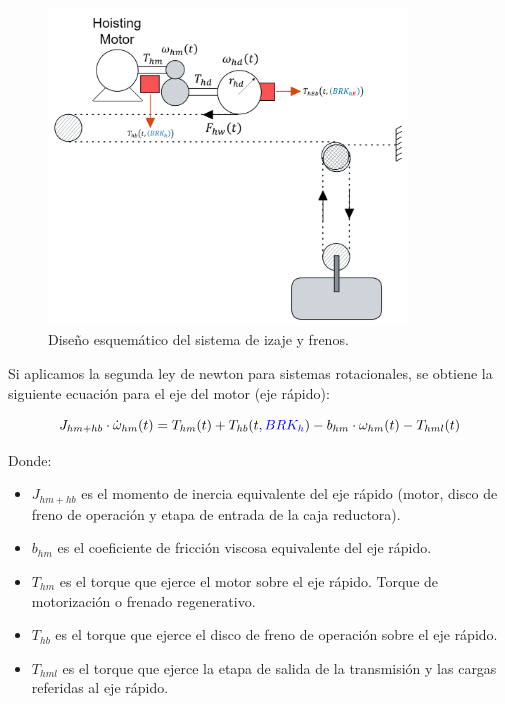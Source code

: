 \documentclass[11pt]{article}
\begin{document}
\begin{figure}[h!]
	\centering
	\includegraphics[width=0.85\textwidth]{images/imagen_5_sistema_izaje.png}
	\caption{Diseño esquemático del sistema de izaje y frenos.}
	\label{fig:sistema_izaje}
\end{figure}

Si aplicamos la segunda ley de newton para sistemas rotacionales, se obtiene la siguiente ecuación para el eje del motor (eje rápido):

\begin{equation}
	\label{eq:sistema_izaje_eje_rapido}
	J_{hm+hb}\cdot\dot{\omega}_{hm}(t)=T_{hm}(t)+T_{hb}(t,{\color{blue}BRK_{h}})-b_{hm}\cdot\omega_{hm}(t)-T_{hml}(t)
\end{equation}

Donde:

\begin{itemize}
	\item $J_{hm+hb}$ es el momento de inercia equivalente del eje rápido (motor, disco de freno de operación y etapa de entrada de la caja reductora).
	\item $b_{hm}$ es el coeficiente de fricción viscosa equivalente del eje rápido.
	\item $T_{hm}$ es el torque que ejerce el motor sobre el eje rápido. Torque de motorización o frenado regenerativo.
	\item $T_{hb}$ es el torque que ejerce el disco de freno de operación sobre el eje rápido.
	\item $T_{hml}$ es el torque que ejerce la etapa de salida de la transmisión y las cargas referidas al eje rápido.
\end{itemize}
\end{document}

